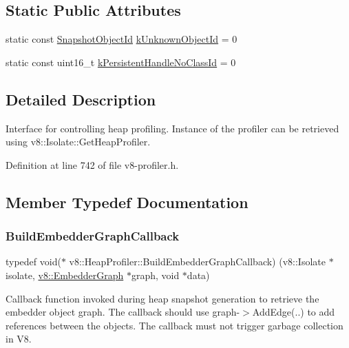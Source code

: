 \subsection*{Static Public Attributes}
\begin{DoxyCompactItemize}
\item 
static const \mbox{\hyperlink{classuint32__t}{Snapshot\+Object\+Id}} \mbox{\hyperlink{classv8_1_1HeapProfiler_a40f41d75716ff1b335e95521296e027d}{k\+Unknown\+Object\+Id}} = 0
\item 
static const uint16\+\_\+t \mbox{\hyperlink{classv8_1_1HeapProfiler_a272c9af3ea5cd90a2737af3d22a7eb78}{k\+Persistent\+Handle\+No\+Class\+Id}} = 0
\end{DoxyCompactItemize}


\subsection{Detailed Description}
Interface for controlling heap profiling. Instance of the profiler can be retrieved using v8\+::\+Isolate\+::\+Get\+Heap\+Profiler. 

Definition at line 742 of file v8-\/profiler.\+h.



\subsection{Member Typedef Documentation}
\mbox{\label{classv8_1_1HeapProfiler_a29c98afa5ce0ea543eef904201bc3e40}} 
\subsubsection{\texorpdfstring{Build\+Embedder\+Graph\+Callback}{BuildEmbedderGraphCallback}}
{\footnotesize\ttfamily typedef void($\ast$ v8\+::\+Heap\+Profiler\+::\+Build\+Embedder\+Graph\+Callback) (v8\+::\+Isolate $\ast$isolate, \mbox{\hyperlink{classv8_1_1EmbedderGraph}{v8\+::\+Embedder\+Graph}} $\ast$graph, void $\ast$data)}

Callback function invoked during heap snapshot generation to retrieve the embedder object graph. The callback should use graph-\/$>$Add\+Edge(..) to add references between the objects. The callback must not trigger garbage collection in V8. 

